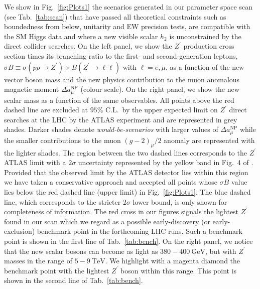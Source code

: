 \documentclass[a4paper,11pt]{article}
\renewcommand{\(}{\left(}
\renewcommand{\)}{\right)}
\renewcommand{\[}{\left[}
\renewcommand{\]}{\right]}
\newcommand{\ro}[1]{\textrm{#1}}
\begin{document}
We show in Fig.~\ref{fig:Plots1} the scenarios generated in our parameter space scan (see Tab.~\ref{tab:scan}) that have passed all theoretical constraints such as boundedness from below, unitarity and EW precision tests, are compatible with the SM Higgs data and where a new visible scalar $h_2$ is unconstrained by the direct collider searches. On the left panel, we show the $Z^\prime$ production cross section times its branching ratio to the first- and second-generation leptons, $\sigma B \equiv \sigma\(pp \to Z^\prime\) \times B\(Z^\prime \to \ell \ell \) $ with $\ell = e,\mu$, as a function of the new vector boson mass and the new physics contribution to the muon anomalous magnetic moment $\Delta a^\ro{NP}_\mu$ (colour scale). On the right panel, we show the new scalar mass as a function of the same observables. All points above the red dashed line are excluded at $95\%$ C.L.~by the upper expected limit on $Z^\prime$ direct searches at the LHC by the ATLAS experiment and are represented in grey shades. Darker shades denote \textit{would-be-scenarios} with larger values of $\Delta a^\ro{NP}_\mu$ while the smaller contributions to the muon $\(g-2\)_\mu / 2$ anomaly are represented with the lighter shades. The region between the two dashed lines corresponds to the $Z^\prime$ ATLAS limit with a $2\sigma$ uncertainty represented by the yellow band in Fig.~4 of \cite{Aaboud:2017buh}. Provided that the observed limit by the ATLAS detector lies within this region we have taken a conservative approach and accepted all points whose $\sigma B$ value lies below the red dashed line (upper limit) in Fig.~\ref{fig:Plots1}. The blue dashed line, which corresponds to the stricter $2 \sigma$ lower bound, is only shown for completeness of information. The red cross in our figures signals the lightest $Z^\prime$ found in our scan which we regard as a possible early-discovery (or early-exclusion) benchmark point in the forthcoming LHC runs. Such a benchmark point is shown in the first line of Tab.~\ref{tab:bench}. On the right panel, we notice that the new scalar bosons can become as light as $380 - 400~\ro{GeV}$, but with $Z^\prime$ masses in the range of $5 - 9~\ro{TeV}$. We highlight with a magenta diamond the benchmark point with the lightest $Z^\prime$ boson within this range. This point is shown in the second line of Tab.~\ref{tab:bench}.
%
\end{document}
